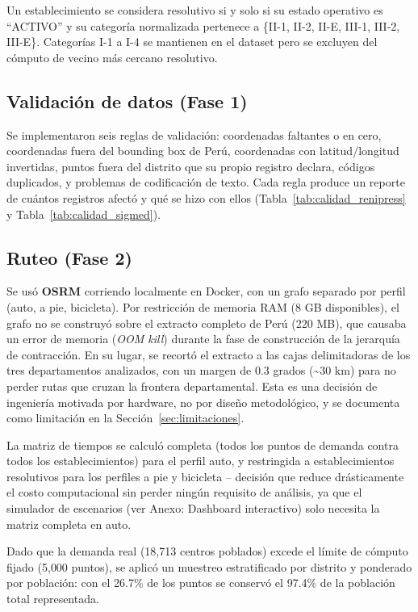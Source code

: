 \documentclass[11pt,a4paper]{article}
\begin{document}
Un establecimiento se considera resolutivo si y solo si su estado operativo es
``ACTIVO'' y su categoría normalizada pertenece a
\{II-1, II-2, II-E, III-1, III-2, III-E\}. Categorías I-1 a I-4 se mantienen en el
dataset pero se excluyen del cómputo de vecino más cercano resolutivo.

\subsection{Validación de datos (Fase 1)}

Se implementaron seis reglas de validación: coordenadas faltantes o en cero,
coordenadas fuera del bounding box de Perú, coordenadas con latitud/longitud
invertidas, puntos fuera del distrito que su propio registro declara, códigos
duplicados, y problemas de codificación de texto. Cada regla produce un reporte
de cuántos registros afectó y qué se hizo con ellos (Tabla~\ref{tab:calidad_renipress}
y Tabla~\ref{tab:calidad_sigmed}).

\subsection{Ruteo (Fase 2)}

Se usó \textbf{OSRM} corriendo localmente en Docker, con un grafo separado por
perfil (auto, a pie, bicicleta). Por restricción de memoria RAM (8 GB
disponibles), el grafo no se construyó sobre el extracto completo de Perú
(220 MB), que causaba un error de memoria (\emph{OOM kill}) durante la fase de
construcción de la jerarquía de contracción. En su lugar, se recortó el extracto
a las cajas delimitadoras de los tres departamentos analizados, con un margen de
0.3 grados (\textasciitilde{}30 km) para no perder rutas que cruzan la frontera
departamental. Esta es una decisión de ingeniería motivada por hardware, no por
diseño metodológico, y se documenta como limitación en la Sección~\ref{sec:limitaciones}.

La matriz de tiempos se calculó completa (todos los puntos de demanda contra
todos los establecimientos) para el perfil auto, y restringida a establecimientos
resolutivos para los perfiles a pie y bicicleta -- decisión que reduce
drásticamente el costo computacional sin perder ningún requisito de análisis,
ya que el simulador de escenarios (ver Anexo: Dashboard interactivo) solo necesita la
matriz completa en auto.

Dado que la demanda real (18{,}713 centros poblados) excede el límite de cómputo
fijado (5{,}000 puntos), se aplicó un muestreo estratificado por distrito y
ponderado por población: con el 26.7\% de los puntos se conservó el 97.4\% de la
población total representada.
\end{document}
